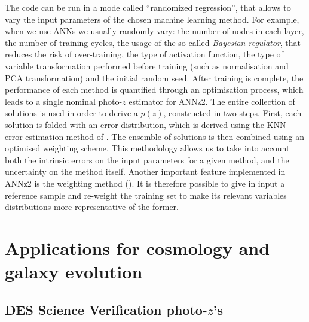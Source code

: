 The code can be run in a mode called ``randomized regression'', that allows to vary the input parameters of the chosen machine learning method. For example, when we use ANNs we usually randomly vary: the number of nodes in each layer, the number of training cycles, the usage of the so-called \emph{Bayesian regulator}, that reduces the risk of over-training, the type of activation function, the type of variable transformation performed before training (such as normalisation and PCA transformation) and the initial random seed.  After training is complete,  the performance of each method is quantified through an optimisation process, which leads to a single nominal photo-$z$ estimator for \textsc{ANNz2}. The entire collection of solutions is used in order to derive a $p(z)$, constructed in two steps.
First, each solution is folded with an error distribution, which is derived using the KNN error estimation method of \citealt{oyaizu}.
The ensemble of solutions is then combined using an optimised weighting scheme. This methodology allows us to take into account both the intrinsic errors on the input parameters for a given method, and the uncertainty on the method itself. %
Another important feature implemented in ANNz2 is the weighting method (\citealt{lima}). It is therefore possible to give in input a reference sample and re-weight the training set to make its relevant variables distributions more representative of the former. \\


\section{Applications for cosmology and galaxy evolution}

\subsection{DES Science Verification photo-$z$'s}

